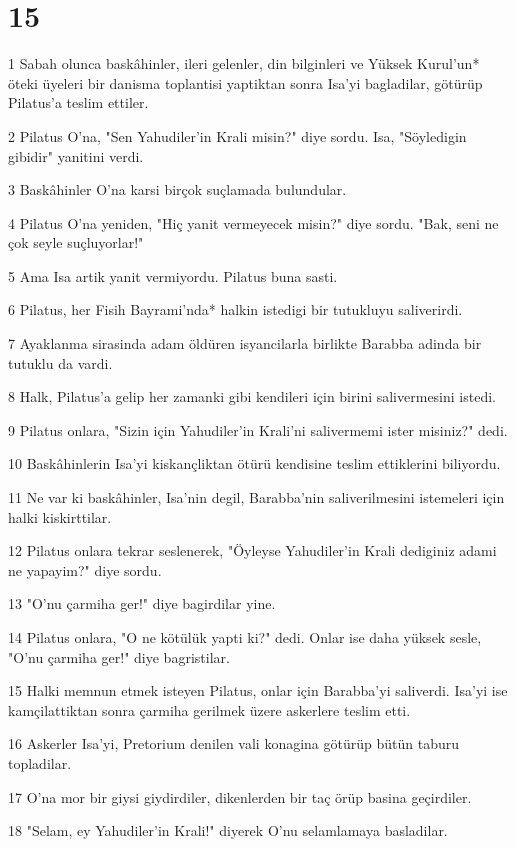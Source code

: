 \chapter{15}

\par 1 Sabah olunca baskâhinler, ileri gelenler, din bilginleri ve Yüksek Kurul'un* öteki üyeleri bir danisma toplantisi yaptiktan sonra Isa'yi bagladilar, götürüp Pilatus'a teslim ettiler.
\par 2 Pilatus O'na, "Sen Yahudiler'in Krali misin?" diye sordu. Isa, "Söyledigin gibidir" yanitini verdi.
\par 3 Baskâhinler O'na karsi birçok suçlamada bulundular.
\par 4 Pilatus O'na yeniden, "Hiç yanit vermeyecek misin?" diye sordu. "Bak, seni ne çok seyle suçluyorlar!"
\par 5 Ama Isa artik yanit vermiyordu. Pilatus buna sasti.
\par 6 Pilatus, her Fisih Bayrami'nda* halkin istedigi bir tutukluyu saliverirdi.
\par 7 Ayaklanma sirasinda adam öldüren isyancilarla birlikte Barabba adinda bir tutuklu da vardi.
\par 8 Halk, Pilatus'a gelip her zamanki gibi kendileri için birini salivermesini istedi.
\par 9 Pilatus onlara, "Sizin için Yahudiler'in Krali'ni salivermemi ister misiniz?" dedi.
\par 10 Baskâhinlerin Isa'yi kiskançliktan ötürü kendisine teslim ettiklerini biliyordu.
\par 11 Ne var ki baskâhinler, Isa'nin degil, Barabba'nin saliverilmesini istemeleri için halki kiskirttilar.
\par 12 Pilatus onlara tekrar seslenerek, "Öyleyse Yahudiler'in Krali dediginiz adami ne yapayim?" diye sordu.
\par 13 "O'nu çarmiha ger!" diye bagirdilar yine.
\par 14 Pilatus onlara, "O ne kötülük yapti ki?" dedi. Onlar ise daha yüksek sesle, "O'nu çarmiha ger!" diye bagristilar.
\par 15 Halki memnun etmek isteyen Pilatus, onlar için Barabba'yi saliverdi. Isa'yi ise kamçilattiktan sonra çarmiha gerilmek üzere askerlere teslim etti.
\par 16 Askerler Isa'yi, Pretorium denilen vali konagina götürüp bütün taburu topladilar.
\par 17 O'na mor bir giysi giydirdiler, dikenlerden bir taç örüp basina geçirdiler.
\par 18 "Selam, ey Yahudiler'in Krali!" diyerek O'nu selamlamaya basladilar.
